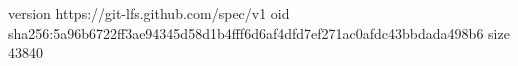version https://git-lfs.github.com/spec/v1
oid sha256:5a96b6722ff3ae94345d58d1b4fff6d6af4dfd7ef271ac0afdc43bbdada498b6
size 43840
